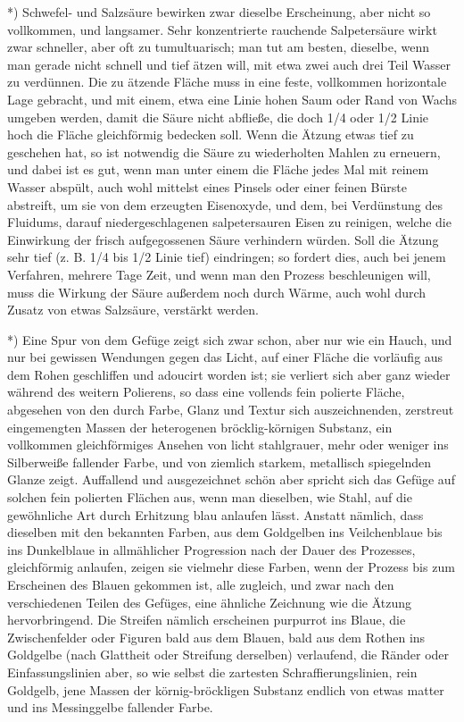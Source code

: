 \documentclass[a4paper, 11pt, oneside, german]{article}
\begin{document}
*) Schwefel- und Salzsäure bewirken zwar dieselbe Erscheinung, aber nicht so vollkommen, und langsamer. Sehr konzentrierte rauchende Salpetersäure wirkt zwar schneller, aber oft zu tumultuarisch; man tut am besten, dieselbe, wenn man gerade nicht schnell und tief ätzen will, mit etwa zwei auch drei Teil Wasser zu verdünnen. Die zu ätzende Fläche muss in eine feste, vollkommen horizontale Lage gebracht, und mit einem, etwa eine Linie hohen Saum oder Rand von Wachs umgeben werden, damit die Säure nicht abfließe, die doch 1/4 oder 1/2 Linie hoch die Fläche gleichförmig bedecken soll. Wenn die Ätzung etwas tief zu geschehen hat, so ist notwendig die Säure zu wiederholten Mahlen zu erneuern, und dabei ist es gut, wenn man unter einem die Fläche jedes Mal mit reinem Wasser abspült, auch wohl mittelst eines Pinsels oder einer feinen Bürste abstreift, um sie von dem erzeugten Eisenoxyde, und dem, bei Verdünstung des Fluidums, darauf niedergeschlagenen salpetersauren Eisen zu reinigen, welche die Einwirkung der frisch aufgegossenen Säure verhindern würden. Soll die Ätzung sehr tief (z. B. 1/4 bis 1/2 Linie tief) eindringen; so fordert dies, auch bei jenem Verfahren, mehrere Tage Zeit, und wenn man den Prozess beschleunigen will, muss die Wirkung der Säure außerdem noch durch Wärme, auch wohl durch Zusatz von etwas Salzsäure, verstärkt werden.

*) Eine Spur von dem Gefüge zeigt sich zwar schon, aber nur wie ein Hauch, und nur bei gewissen Wendungen gegen das Licht, auf einer Fläche die vorläufig aus dem Rohen geschliffen und adoucirt worden ist; sie verliert sich aber ganz wieder während des weitern Polierens, so dass eine vollends fein polierte Fläche, abgesehen von den durch Farbe, Glanz und Textur sich auszeichnenden, zerstreut eingemengten Massen der heterogenen bröcklig-körnigen Substanz, ein vollkommen gleichförmiges Ansehen von licht stahlgrauer, mehr oder weniger ins Silberweiße fallender Farbe, und von ziemlich starkem, metallisch spiegelnden Glanze zeigt. Auffallend und ausgezeichnet schön aber spricht sich das Gefüge auf solchen fein polierten Flächen aus, wenn man dieselben, wie Stahl, auf die gewöhnliche Art durch Erhitzung blau anlaufen lässt. Anstatt nämlich, dass dieselben mit den bekannten Farben, aus dem Goldgelben ins Veilchenblaue bis ins Dunkelblaue in allmählicher Progression nach der Dauer des Prozesses, gleichförmig anlaufen, zeigen sie vielmehr diese Farben, wenn der Prozess bis zum Erscheinen des Blauen gekommen ist, alle zugleich, und zwar nach den verschiedenen Teilen des Gefüges, eine ähnliche Zeichnung wie die Ätzung hervorbringend. Die Streifen nämlich erscheinen purpurrot ins Blaue, die Zwischenfelder oder Figuren bald aus dem Blauen, bald aus dem Rothen ins Goldgelbe (nach Glattheit oder Streifung derselben) verlaufend, die Ränder oder Einfassungslinien aber, so wie selbst die zartesten Schraffierungslinien, rein Goldgelb, jene Massen der körnig-bröckligen Substanz endlich von etwas matter und ins Messinggelbe fallender Farbe.
\end{document}
